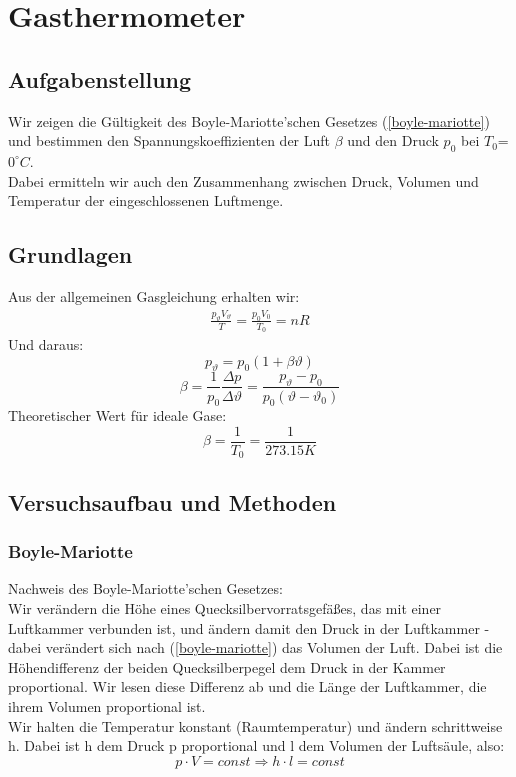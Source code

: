 \documentclass{article}
\begin{document}
\section{Gasthermometer}
\subsection{Aufgabenstellung}
Wir zeigen die Gültigkeit des Boyle-Mariotte'schen Gesetzes (\ref{boyle-mariotte}) und bestimmen den Spannungskoeffizienten der Luft $\beta$ und den Druck $p_0$ bei $T_0$= $0^\circ C$.\\
Dabei ermitteln wir auch den Zusammenhang zwischen Druck, Volumen und Temperatur der eingeschlossenen Luftmenge.
\subsection{Grundlagen}
Aus der allgemeinen Gasgleichung erhalten wir:
\begin{gather*}
\frac{p_{\vartheta}V_{\vartheta}}{T}=\frac{p_0V_0}{T_0}=nR
\end{gather*}
Und daraus:
$$p_{\vartheta}=p_0 (1+\beta \vartheta)$$
\begin{equation}
\label{beta}
\beta=\frac{1}{p_0}\frac{\Delta p}{\Delta \vartheta}=\frac{p_{\vartheta}-p_0}{p_0(\vartheta - \vartheta_0)}
\end{equation}
Theoretischer Wert für ideale Gase:\\
$$\beta=\frac{1}{T_0}=\frac{1}{273.15K}$$

\subsection{Versuchsaufbau und Methoden}
\subsubsection*{Boyle-Mariotte}
Nachweis des Boyle-Mariotte'schen Gesetzes:\\

Wir verändern die Höhe eines Quecksilbervorratsgefäßes, das mit einer Luftkammer verbunden ist, und ändern damit den Druck in der Luftkammer - dabei verändert sich nach (\ref{boyle-mariotte}) das Volumen der Luft. Dabei ist die Höhendifferenz der beiden Quecksilberpegel dem Druck in der Kammer proportional. Wir lesen diese Differenz ab und die Länge der Luftkammer, die ihrem Volumen proportional ist. \\
Wir halten die Temperatur konstant (Raumtemperatur) und ändern schrittweise h. Dabei ist h dem Druck p proportional und l dem Volumen der Luftsäule, also:
$$p\cdot V=const \Rightarrow h \cdot l=const$$
\end{document}
